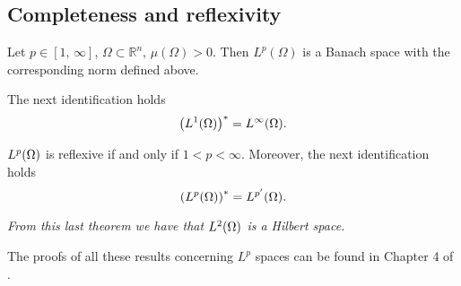 \subsection*{Completeness and reflexivity}
\begin{theorem}Let $p\in [1,\,\infty]$, $\Omega\subset \mathbb{R}^n,\,\mu(\Omega)>0$. Then $L^p(\Omega)$ is a Banach space with the corresponding norm defined above.
\end{theorem}
\begin{theorem} The next identification holds
$$\left({L^{1}(\Omega)}\right)^*={L^{\infty}(\Omega)}.$$
\end{theorem}
\begin{theorem}
${L^{p}(\Omega)}$ is reflexive if and only if $1<p<\infty$. Moreover, the next identification holds $$\left({L^{p}(\Omega)}\right)^*={L^{p'}(\Omega)}.$$
\end{theorem}
\begin{remark}\it
From this last theorem we have that ${L^{2}(\Omega)}$ is a Hilbert space.
\end{remark}

The proofs of all these results concerning $L^p$ spaces can be found in Chapter 4 of \cite{brezis2011}.


